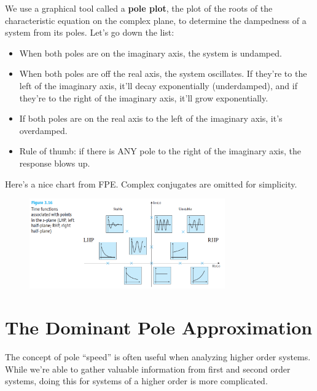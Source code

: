 \documentclass[
  letterpaper,
  DIV=11,
  numbers=noendperiod]{scrreprt}
\providecommand{\tightlist}{%
  \setlength{\itemsep}{0pt}\setlength{\parskip}{0pt}}\usepackage{longtable,booktabs,array}
\begin{document}
We use a graphical tool called a \textbf{pole plot}, the plot of the
roots of the characteristic equation on the complex plane, to determine
the dampedness of a system from its poles. Let's go down the list:

\begin{itemize}
\tightlist
\item
  When both poles are on the imaginary axis, the system is undamped.
\item
  When both poles are off the real axis, the system oscillates. If
  they're to the left of the imaginary axis, it'll decay exponentially
  (underdamped), and if they're to the right of the imaginary axis,
  it'll grow exponentially.
\item
  If both poles are on the real axis to the left of the imaginary axis,
  it's overdamped.
\item
  Rule of thumb: if there is ANY pole to the right of the imaginary
  axis, the response blows up.
\end{itemize}

Here's a nice chart from FPE. Complex conjugates are omitted for
simplicity.

\begin{figure}

{\centering \includegraphics[width=0.75\textwidth,height=\textheight]{figs/3_pol.png}

}

\end{figure}

\hypertarget{the-dominant-pole-approximation}{%
\section{The Dominant Pole
Approximation}\label{the-dominant-pole-approximation}}

The concept of pole ``speed'' is often useful when analyzing higher
order systems. While we're able to gather valuable information from
first and second order systems, doing this for systems of a higher order
is more complicated.
\end{document}
